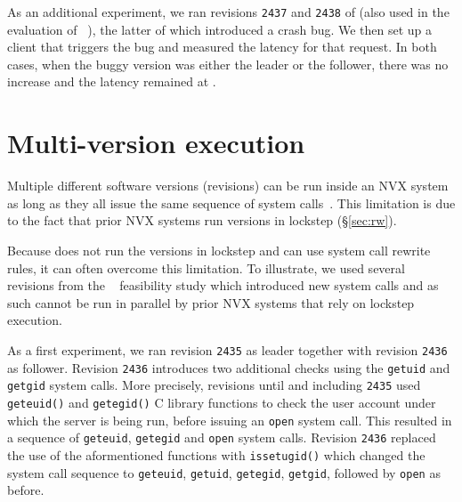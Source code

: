 As an additional experiment, we ran revisions \lstinline`2437` and
\lstinline`2438` of \lighttpd (also used in the evaluation of
\mx~\cite{mx}), the latter of which introduced a crash bug.  We then
set up a client that triggers the bug and measured the latency for
that request. In both cases, \ie when the buggy version was either
the leader or the follower, there was no increase and the latency remained
at \lighttpdnormallatency.


\section{Multi-version execution}
\label{sec:mv-execution}

Multiple different software versions (revisions) can be run inside an
NVX system as long as they all issue the same sequence of system
calls~\cite{mx}. This limitation is due to the fact that prior NVX
systems run versions in lockstep (\S\ref{sec:rw}).

Because \varan does not run the versions in lockstep and can use
system call rewrite rules, it can often overcome this limitation. To
illustrate, we used several \lighttpd revisions from the \mx~\cite{mx}
feasibility study which introduced new system calls and as such cannot
be run in parallel by prior NVX systems that rely on lockstep execution.

As a first experiment, we ran revision \lstinline`2435` as
leader together with revision \lstinline`2436` as follower.  Revision
\lstinline`2436` introduces two additional checks using the
\lstinline`getuid` and \lstinline`getgid` system calls.  More
precisely, revisions until and including \lstinline`2435` used
\lstinline`geteuid()` and \lstinline`getegid()` C library functions to
check the user account under which the server is being run, before
issuing an \lstinline`open` system call.  This resulted in a sequence
of \lstinline`geteuid`, \lstinline`getegid` and \lstinline`open`
system calls.  Revision \lstinline`2436` replaced the use of the
aformentioned functions with \lstinline`issetugid()` which changed the
system call sequence to \lstinline`geteuid`, \lstinline`getuid`,
\lstinline`getegid`, \lstinline`getgid`, followed by \lstinline`open`
as before.

